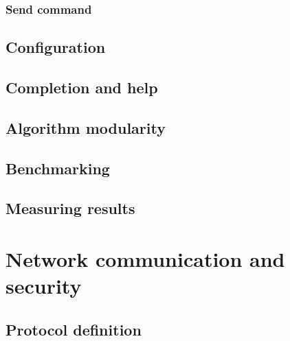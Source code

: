 \subsection{Send command}
\label{sec:cmd_app_send}


\section{Configuration}
\label{sec:cmd_config}


\section{Completion and help}
\label{sec:cmd_help}


\section{Algorithm modularity}
\label{sec:algs_modularity}


% 

\section{Benchmarking}
\label{sec:cmd_benchmark}


\section{Measuring results}
\label{sec:lattice_performance_measuring}


\chapter{Network communication and security}
\label{ch:network_com_sec}


\section{Protocol definition}
\label{sec:protocol_def}


